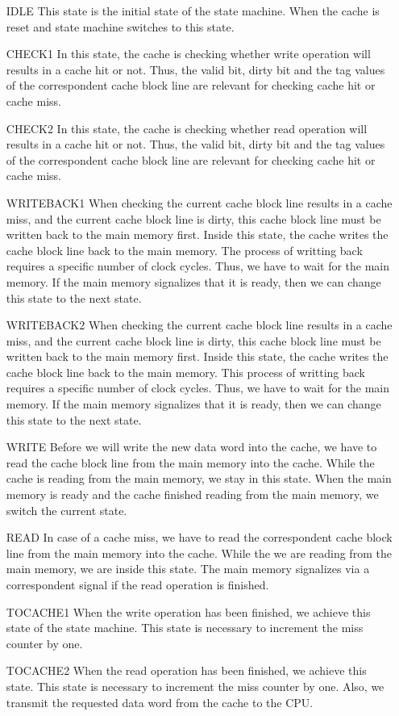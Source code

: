 \begin{itemize}
	\item[IDLE] This state is the initial state of the state machine. When the cache is reset and state machine switches to this state.
	\item[CHECK1] In this state, the cache is checking whether write operation will results in a cache hit or not. Thus, the valid bit, dirty bit and the tag values of the correspondent cache block line are relevant for checking cache hit or cache miss.
	\item[CHECK2] In this state, the cache is checking whether read operation will results in a cache hit or not. Thus, the valid bit, dirty bit and the tag values of the correspondent cache block line are relevant for checking cache hit or cache miss.
	\item[WRITEBACK1] When checking the current cache block line results in a cache miss, and the current cache block line is dirty, this cache block line must be written back to the main memory first. Inside this state, the cache writes the cache block line back to the main memory. The process of writting back requires a specific number of clock cycles. Thus, we have to wait for the main memory. If the main memory signalizes that it is ready, then we can change this state to the next state.
	\item[WRITEBACK2] When checking the current cache block line results in a cache miss, and the current cache block line is dirty, this cache block line must be written back to the main memory first. Inside this state, the cache writes the cache block line back to the main memory. This process of writting back requires a specific number of clock cycles. Thus, we have to wait for the main memory. If the main memory signalizes that it is ready, then we can change this state to the next state.
	\item[WRITE] Before we will write the new data word into the cache, we have to read the cache block line from the main memory into the cache. While the cache is reading from the main memory, we stay in this state. When the main memory is ready and the cache finished reading from the main memory, we switch the current state.
	\item[READ] In case of a cache miss, we have to read the correspondent cache block line from the main memory into the cache. While the we are reading from the main memory, we are inside this state. The main memory signalizes via a correspondent signal if the read operation is finished.
	\item[TOCACHE1] When the write operation has been finished, we achieve this state of the state machine. This state is necessary to increment the miss counter by one. 
	\item[TOCACHE2] When the read operation has been finished, we achieve this state. This state is necessary to increment the miss counter by one. Also, we transmit the requested data word from the cache to the CPU.
\end{itemize}


